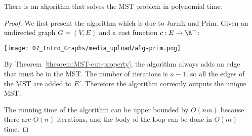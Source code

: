\begin{flex}
\label{grp:theorem:Jarnik-Prim-algorithm-for-MST}

\begin{theorem}
\label{theorem:Jarnik-Prim-algorithm-for-MST}
There is an algorithm that solves the MST problem in polynomial time.

\end{theorem}

\begin{proof}
\label{prf:intro-to-graph-theory::present}
We first present the algorithm which is due to Jarn\'{i}k and Prim. Given an undirected graph $G=(V,E)$ and a cost function $c : E \to \R^+$:

\begin{center}
    \texttt{[image: 07\_Intro\_Graphs/media\_upload/alg-prim.png]}
\end{center}

By Theorem~\ref{theorem:MST-cut-property}, the algorithm always adds an edge that must be in the MST. The number of iterations is $n-1$, so all the edges of the MST are added to $E'$. Therefore the algorithm correctly outputs the unique MST. 

The running time of the algorithm can be upper bounded by $O(nm)$ because there are $O(n)$ iterations, and the body of the loop can be done in $O(m)$ time.

\end{proof}
\end{flex}

